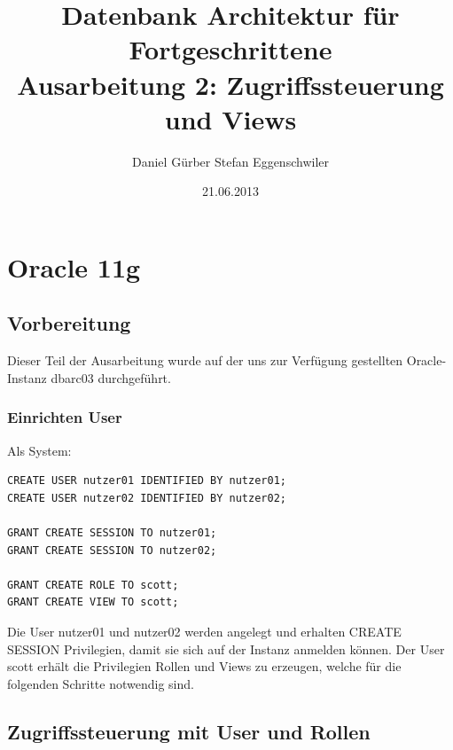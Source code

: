 \documentclass[10pt]{scrreprt}
\title{
\vspace{4cm}
\huge{Datenbank Architektur für Fortgeschrittene}\\
\vspace{0.2cm}
\Large{Ausarbeitung 2: Zugriffssteuerung und Views}\\
}
\author{Daniel Gürber \cr Stefan Eggenschwiler}
\date{21.06.2013}
\begin{document}
\maketitle
\thispagestyle{fancy}

\newpage

\tableofcontents	


\newpage
\setcounter{page}{1}

\chapter{Oracle 11g}
\section{Vorbereitung}
Dieser Teil der Ausarbeitung wurde auf der uns zur Verfügung gestellten Oracle-Instanz dbarc03 durchgeführt.
\subsection{Einrichten User}
Als System:
\begin{lstlisting}[style=sql]
CREATE USER nutzer01 IDENTIFIED BY nutzer01;
CREATE USER nutzer02 IDENTIFIED BY nutzer02;

GRANT CREATE SESSION TO nutzer01;
GRANT CREATE SESSION TO nutzer02;

GRANT CREATE ROLE TO scott;
GRANT CREATE VIEW TO scott;
\end{lstlisting}
Die User nutzer01 und nutzer02 werden angelegt und erhalten CREATE SESSION Privilegien, damit sie sich auf der Instanz anmelden können. Der User scott erhält die Privilegien Rollen und Views zu erzeugen, welche für die folgenden Schritte notwendig sind.

\section{Zugriffssteuerung mit User und Rollen}
\end{document}
